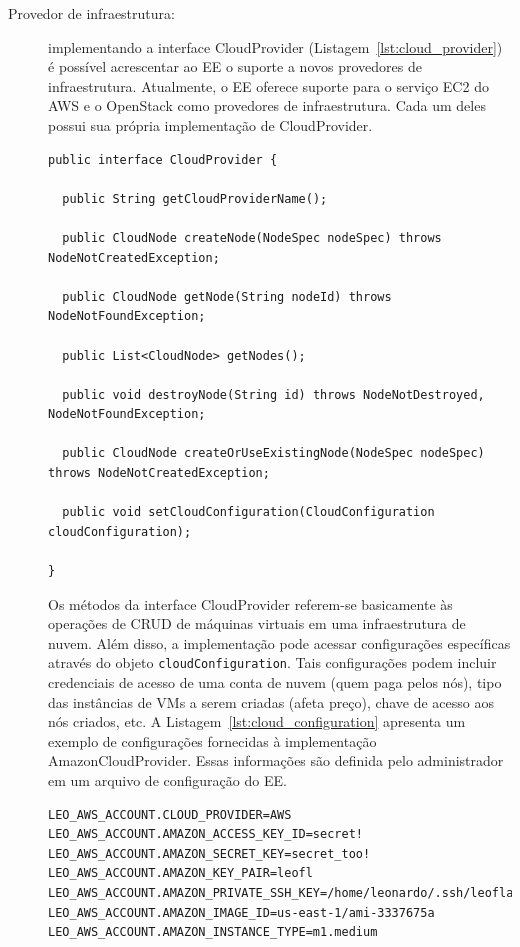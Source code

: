 \begin{description}

\item [Provedor de infraestrutura:] implementando a interface \textsf{CloudProvider} (Listagem~\ref{lst:cloud_provider}) 
é possível acrescentar ao EE o suporte a novos provedores de infraestrutura. 
Atualmente, o EE oferece suporte para o serviço EC2 do AWS e o OpenStack como provedores de infraestrutura.
Cada um deles possui sua própria implementação de \textsf{CloudProvider}.

\begin{lstlisting}[frame=trbl, label=lst:cloud_provider, caption=Interface CloudProvider.]
public interface CloudProvider {

  public String getCloudProviderName();

  public CloudNode createNode(NodeSpec nodeSpec) throws NodeNotCreatedException;

  public CloudNode getNode(String nodeId) throws NodeNotFoundException;

  public List<CloudNode> getNodes();

  public void destroyNode(String id) throws NodeNotDestroyed, NodeNotFoundException;

  public CloudNode createOrUseExistingNode(NodeSpec nodeSpec) throws NodeNotCreatedException;

  public void setCloudConfiguration(CloudConfiguration cloudConfiguration);

}
\end{lstlisting}

Os métodos da interface \textsf{CloudProvider} referem-se basicamente às operações de CRUD de máquinas virtuais
em uma infraestrutura de nuvem. Além disso, a implementação pode acessar configurações específicas 
através do objeto \texttt{cloudConfiguration}. Tais configurações podem incluir 
credenciais de acesso de uma conta de nuvem (quem paga pelos nós), tipo das instâncias de VMs a serem criadas (afeta preço),
chave de acesso aos nós criados, etc. A Listagem~\ref{lst:cloud_configuration} apresenta um exemplo de configurações
fornecidas à implementação \textsf{AmazonCloudProvider}. 
Essas informações são definida pelo administrador em um arquivo de configuração do EE.

\begin{lstlisting}[frame=trbl, label=lst:cloud_configuration, caption=Configuração do \textsf{AmazonCloudProvider}.]
LEO_AWS_ACCOUNT.CLOUD_PROVIDER=AWS
LEO_AWS_ACCOUNT.AMAZON_ACCESS_KEY_ID=secret!
LEO_AWS_ACCOUNT.AMAZON_SECRET_KEY=secret_too!
LEO_AWS_ACCOUNT.AMAZON_KEY_PAIR=leofl
LEO_AWS_ACCOUNT.AMAZON_PRIVATE_SSH_KEY=/home/leonardo/.ssh/leoflaws.pem
LEO_AWS_ACCOUNT.AMAZON_IMAGE_ID=us-east-1/ami-3337675a
LEO_AWS_ACCOUNT.AMAZON_INSTANCE_TYPE=m1.medium
\end{lstlisting}
 

\end{description}
